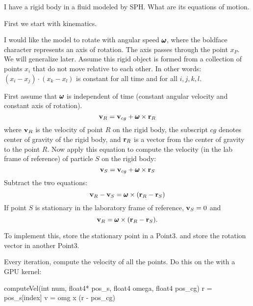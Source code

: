 \documentclass[11pt]{article}
\begin{document}
I have a rigid body in a fluid modeled by SPH. What are its equations 
of motion. 

First we start with kinematics. 

I would like the model to rotate with angular speed $\omgvec$, where the 
boldface character represents an axis of rotation. The axis passes
through the point $x_P$.  We will generalize later. Assume this rigid
object is formed from a collection of points $x_i$ that do not move 
relative to each other. In other words: $(x_i-x_j)\cdot(x_k-x_l)$ is 
constant for all time and for all $i,j,k,l$. 

First assume that $\omgvec$ is independent of time (constant angular
velocity and constant axis of rotation).
$$
\vvec_R = \vvec_{cg} + \omgvec \times \rvec_R
$$
where ${\bf v}_R$ is the velocity of point $R$ on the rigid body, the 
subscript $cg$  denotes center of gravity of the rigid body, 
and ${\bf r}_R$ is a vector from the center of gravity to the point $R$. 
Now apply this equation to compute the velocity (in the lab frame of 
reference) of particle $S$ on the rigid body: 
$$
\vvec_S = \vvec_{cg} + \omgvec \times \rvec_S
$$
Subtract the two equations: 
$$
\vvec_R-\vvec_S = \omgvec \times (\rvec_R-\rvec_S)
$$
If point $S$ is stationary in the laboratory frame of reference, 
${\bf v}_S=0$ and
$$
\vvec_R = \omgvec \times (\rvec_R-\rvec_S) .
$$

To implement this, store the stationary point in a Point3.
and store the rotation vector in another Point3. 

Every iteration, compute the velocity of all the points. Do this on the 
with a GPU kernel: 

computeVel(int num, float4* pos_s, float4 omega, float4 pos_cg)
{
    r = pos_s[index] 
	v = omg x (r - pos_cg)
}
\end{document}
